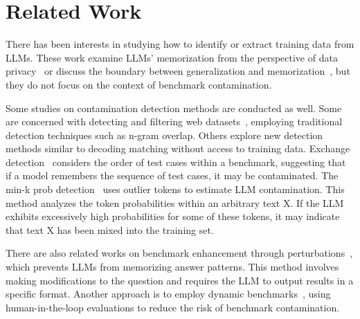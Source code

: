 \section{Related Work}


There has been interests in studying how to identify or extract training data from LLMs.
These work examine LLMs' memorization from the perspective of data privacy~\citep{carlini2021extracting, pan2020privacy, zanella2020analyzing, balle2022reconstructing} or discuss the boundary between generalization and memorization~\citep{zhang2017understanding, olson2018modern, recht2019imagenet,carlini2023quantifying}, but they do not focus on the context of benchmark contamination.

Some studies on contamination detection methods are conducted as well.
Some are concerned with detecting and filtering web datasets~\citep{dodge2021documenting,xu2017zipporah}, employing traditional detection techniques such as n-gram overlap.
Others explore new detection methods similar to decoding matching without access to training data.
Exchange detection~\citep{oren2023proving} considers the order of test cases within a benchmark, suggesting that if a model remembers the sequence of test cases, it may be contaminated.
The min-k prob detection~\citep{shi2023detecting} uses outlier tokens to estimate LLM contamination. 
This method analyzes the token probabilities within an arbitrary text X. If the LLM exhibits excessively high probabilities for some of these tokens, it may indicate that text X has been mixed into the training set.

There are also related works on benchmark enhancement through perturbations~\citep{zong2023fool}, which prevents LLMs from memorizing answer patterns.
This method involves making modifications to the question and requires the LLM to output results in a specific format.
Another approach is to employ dynamic benchmarks~\citep{kiela2021dynabench,ma2021dynaboard}, using human-in-the-loop evaluations to reduce the risk of benchmark contamination.